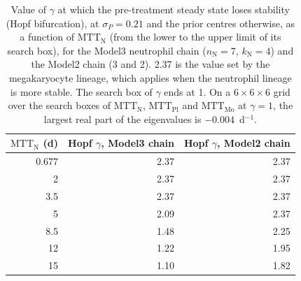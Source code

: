 \begin{table}[!htbp]
\centering
\small
\setlength{\tabcolsep}{3.5pt}
\caption{Value of $\gamma$ at which the pre-treatment steady state loses stability (Hopf bifurcation), at $\sigma_P=0.21$ and the prior centres otherwise, as a function of $\mathrm{MTT}_{\mathrm{N}}$ (from the lower to the upper limit of its search box), for the Model3 neutrophil chain ($n_{\mathrm{N}}=7$, $k_{\mathrm{N}}=4$) and the Model2 chain (3 and 2). 2.37 is the value set by the megakaryocyte lineage, which applies when the neutrophil lineage is more stable. The search box of $\gamma$ ends at 1. On a $6\times6\times6$ grid over the search boxes of $\mathrm{MTT}_{\mathrm{N}}$, $\mathrm{MTT}_{\mathrm{Pl}}$ and $\mathrm{MTT}_{\mathrm{Mo}}$ at $\gamma=1$, the largest real part of the eigenvalues is $-0.004$~d$^{-1}$.}
\label{tab:hopf}
\begin{tabular}{rrr}
\toprule
$\mathrm{MTT}_{\mathrm{N}}$ (d) & Hopf $\gamma$, Model3 chain & Hopf $\gamma$, Model2 chain \\
\midrule
0.677 & 2.37 & 2.37 \\
2 & 2.37 & 2.37 \\
3.5 & 2.37 & 2.37 \\
5 & 2.09 & 2.37 \\
8.5 & 1.48 & 2.25 \\
12 & 1.22 & 1.95 \\
15 & 1.10 & 1.82 \\
\bottomrule
\end{tabular}
\end{table}
